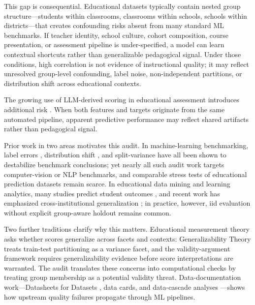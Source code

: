 \documentclass[10pt,letterpaper]{wlscirep}
\begin{document}
This gap is consequential. Educational datasets typically contain nested group structure---students within classrooms, classrooms within schools, schools within districts---that creates confounding risks absent from many standard ML benchmarks. If teacher identity, school culture, cohort composition, course presentation, or assessment pipeline is under-specified, a model can learn contextual shortcuts rather than generalizable pedagogical signal. Under those conditions, high correlation is not evidence of instructional quality; it may reflect unresolved group-level confounding, label noise, non-independent partitions, or distribution shift across educational contexts.

The growing use of LLM-derived scoring in educational assessment introduces additional risk \citep{Zheng2023,Wang2024,Huang2024llm}. When both features and targets originate from the same automated pipeline, apparent predictive performance may reflect shared artifacts rather than pedagogical signal.

Prior work in two areas motivates this audit. In machine-learning benchmarking, label errors \citep{Northcutt2021}, distribution shift \citep{Recht2019}, and split-variance \citep{Bouthillier2021} have all been shown to destabilize benchmark conclusions; yet nearly all such audit work targets computer-vision or NLP benchmarks, and comparable stress tests of educational prediction datasets remain scarce. In educational data mining and learning analytics, many studies predict student outcomes \citep{Romero2020,Baker2014,Gardner2019}, and recent work has emphasized cross-institutional generalization \citep{Chejara2023,Chejara2024}; in practice, however, iid evaluation without explicit group-aware holdout remains common.

Two further traditions clarify why this matters. Educational measurement theory asks whether scores generalize across facets and contexts: Generalizability Theory \citep{Brennan2001} treats train-test partitioning as a variance facet, and the validity-argument framework \citep{Messick1995,Kane2006} requires generalizability evidence before score interpretations are warranted. The audit translates these concerns into computational checks by treating group membership as a potential validity threat. Data-documentation work---Datasheets for Datasets \citep{Gebru2021}, data cards, and data-cascade analyses \citep{Sambasivan2021}---shows how upstream quality failures propagate through ML pipelines.
\end{document}
